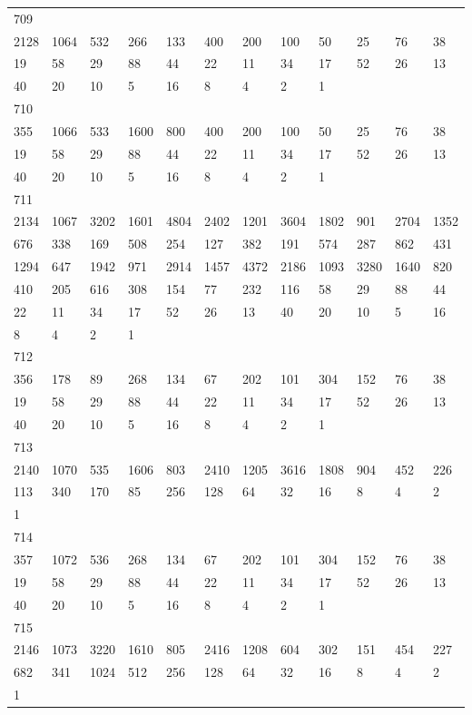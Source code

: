 \begin{longtable}{llllllllllll}
709&&&&&&&&&&&\\
2128& 1064& 532& 266& 133& 400& 200& 100& 50& 25& 76& 38\\
19& 58& 29& 88& 44& 22& 11& 34& 17& 52& 26& 13\\
40& 20& 10& 5& 16& 8& 4& 2& 1& \\

710&&&&&&&&&&&\\
355& 1066& 533& 1600& 800& 400& 200& 100& 50& 25& 76& 38\\
19& 58& 29& 88& 44& 22& 11& 34& 17& 52& 26& 13\\
40& 20& 10& 5& 16& 8& 4& 2& 1& \\

711&&&&&&&&&&&\\
2134& 1067& 3202& 1601& 4804& 2402& 1201& 3604& 1802& 901& 2704& 1352\\
676& 338& 169& 508& 254& 127& 382& 191& 574& 287& 862& 431\\
1294& 647& 1942& 971& 2914& 1457& 4372& 2186& 1093& 3280& 1640& 820\\
410& 205& 616& 308& 154& 77& 232& 116& 58& 29& 88& 44\\
22& 11& 34& 17& 52& 26& 13& 40& 20& 10& 5& 16\\
8& 4& 2& 1& \\

712&&&&&&&&&&&\\
356& 178& 89& 268& 134& 67& 202& 101& 304& 152& 76& 38\\
19& 58& 29& 88& 44& 22& 11& 34& 17& 52& 26& 13\\
40& 20& 10& 5& 16& 8& 4& 2& 1& \\

713&&&&&&&&&&&\\
2140& 1070& 535& 1606& 803& 2410& 1205& 3616& 1808& 904& 452& 226\\
113& 340& 170& 85& 256& 128& 64& 32& 16& 8& 4& 2\\
1& \\

714&&&&&&&&&&&\\
357& 1072& 536& 268& 134& 67& 202& 101& 304& 152& 76& 38\\
19& 58& 29& 88& 44& 22& 11& 34& 17& 52& 26& 13\\
40& 20& 10& 5& 16& 8& 4& 2& 1& \\

715&&&&&&&&&&&\\
2146& 1073& 3220& 1610& 805& 2416& 1208& 604& 302& 151& 454& 227\\
682& 341& 1024& 512& 256& 128& 64& 32& 16& 8& 4& 2\\
1& \\


\end{longtable}
